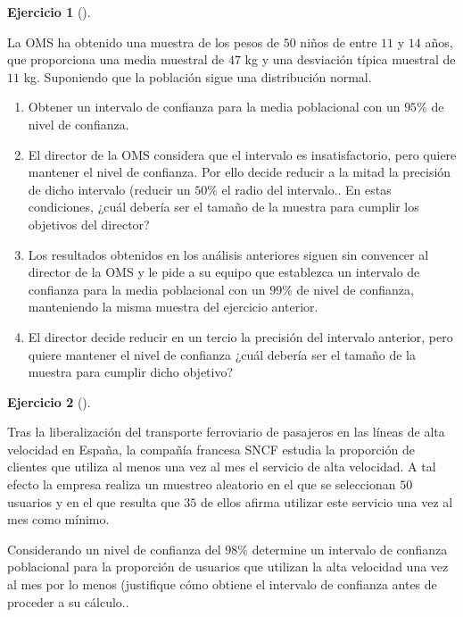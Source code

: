 \documentclass[
  a4paper,
]{scrreport}
\theoremstyle{definition}
\newtheorem{exercise}{Ejercicio}[chapter]
\theoremstyle{remark}
\begin{document}
\begin{exercise}[]\protect\hypertarget{exr-intervalo-confianza-media-peso}{}\label{exr-intervalo-confianza-media-peso}

La OMS ha obtenido una muestra de los pesos de \(50\) niños de entre
\(11\) y \(14\) años, que proporciona una media muestral de \(47\) kg y
una desviación típica muestral de \(11\) kg. Suponiendo que la población
sigue una distribución normal.

\begin{enumerate}
\def\labelenumi{\alph{enumi}.}
\item
  Obtener un intervalo de confianza para la media poblacional con un
  \(95\)\% de nivel de confianza.
\item
  El director de la OMS considera que el intervalo es insatisfactorio,
  pero quiere mantener el nivel de confianza. Por ello decide reducir a
  la mitad la precisión de dicho intervalo (reducir un \(50\)\% el radio
  del intervalo.. En estas condiciones, ¿cuál debería ser el tamaño de
  la muestra para cumplir los objetivos del director?
\item
  Los resultados obtenidos en los análisis anteriores siguen sin
  convencer al director de la OMS y le pide a su equipo que establezca
  un intervalo de confianza para la media poblacional con un \(99\)\% de
  nivel de confianza, manteniendo la misma muestra del ejercicio
  anterior.
\item
  El director decide reducir en un tercio la precisión del intervalo
  anterior, pero quiere mantener el nivel de confianza ¿cuál debería ser
  el tamaño de la muestra para cumplir dicho objetivo?
\end{enumerate}

\end{exercise}

\begin{exercise}[]\protect\hypertarget{exr-intervalo-confianza-proporcion-uso-alta-velocidad}{}\label{exr-intervalo-confianza-proporcion-uso-alta-velocidad}

Tras la liberalización del transporte ferroviario de pasajeros en las
líneas de alta velocidad en España, la compañía francesa SNCF estudia la
proporción de clientes que utiliza al menos una vez al mes el servicio
de alta velocidad. A tal efecto la empresa realiza un muestreo aleatorio
en el que se seleccionan \(50\) usuarios y en el que resulta que \(35\)
de ellos afirma utilizar este servicio una vez al mes como mínimo.

Considerando un nivel de confianza del \(98\)\% determine un intervalo
de confianza poblacional para la proporción de usuarios que utilizan la
alta velocidad una vez al mes por lo menos (justifique cómo obtiene el
intervalo de confianza antes de proceder a su cálculo..

\end{exercise}
\end{document}
